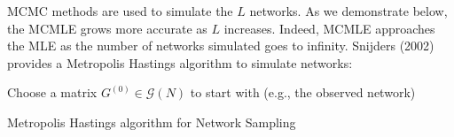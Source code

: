 \documentclass{llncs}
\begin{document}
%
%

\noindent MCMC methods are used to simulate the $L$ networks. As we demonstrate below, the MCMLE grows more accurate as $L$ increases. Indeed, MCMLE approaches the MLE as the number of networks simulated goes to infinity. Snijders (2002) \cite{snijders2002markov} provides a Metropolis Hastings algorithm \cite{chib1995understanding} to simulate networks:\\[0.2cm]

\begin{algorithm}[H]
 Choose a matrix $G^{(0)} \in \mathcal{G}(N)$ to start with (e.g., the observed network)\\
 \caption{Metropolis Hastings algorithm for Network Sampling}
\end{algorithm}
\end{document}
